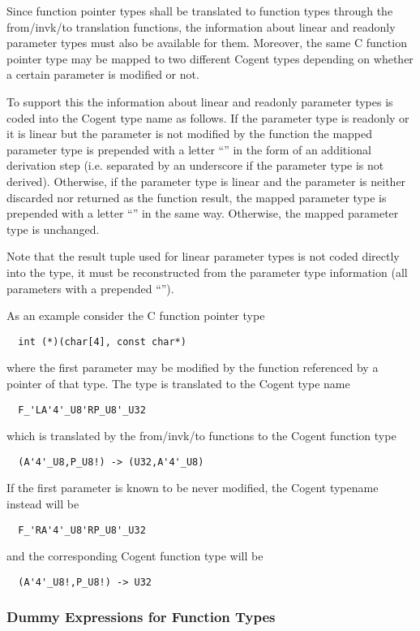 Since function pointer types shall be translated to function types through the from/invk/to translation functions, the 
information about linear and readonly parameter types must also be available for them. Moreover, the same C function
pointer type may be mapped to two different Cogent types depending on whether a certain parameter is modified or not. 

To support this the information about linear and readonly parameter types is coded into the Cogent type name as follows.
If the parameter type is readonly or it is linear but the parameter is not modified by the function the mapped
parameter type is prepended with a letter ``'' in the form of an additional derivation step (i.e. separated by 
an underscore if the parameter type is not derived). Otherwise, if the parameter type is linear and the parameter is 
neither discarded nor returned as the function result, the mapped parameter type is prepended with a 
letter ``'' in the same way. Otherwise, the mapped parameter type is unchanged.

Note that the result tuple used for linear parameter types is not coded directly into the type, it must be 
reconstructed from the parameter type information (all parameters with a prepended ``''). 

As an example consider the C function pointer type
\begin{verbatim}
  int (*)(char[4], const char*)
\end{verbatim}
where the first parameter may be modified by the function referenced by a pointer of that type.
The type is translated to the Cogent type name
\begin{verbatim}
  F_'LA'4'_U8'RP_U8'_U32
\end{verbatim}
which is translated by the from/invk/to functions to the Cogent function type
\begin{verbatim}
  (A'4'_U8,P_U8!) -> (U32,A'4'_U8)
\end{verbatim}
If the first parameter is known to be never modified, the Cogent typename instead will be
\begin{verbatim}
  F_'RA'4'_U8'RP_U8'_U32
\end{verbatim}
and the corresponding Cogent function type will be
\begin{verbatim}
  (A'4'_U8!,P_U8!) -> U32
\end{verbatim}

\subsubsection{Dummy Expressions for Function Types}

